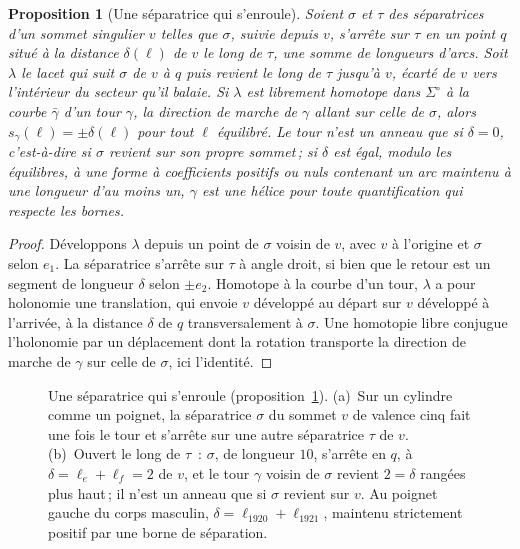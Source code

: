 \documentclass[11pt,a4paper]{article}
\newtheorem{proposition}{Proposition}
\newcommand{\shift}{s}
\begin{document}
\begin{proposition}[Une séparatrice qui s'enroule]\label{prop:winding}
Soient $\sigma$ et $\tau$ des séparatrices d'un sommet singulier $v$ telles
que $\sigma$, suivie depuis $v$, s'arrête sur $\tau$ en un point $q$ situé à
la distance $\delta(\ell)$ de $v$ le long de $\tau$, une somme de longueurs
d'arcs. Soit $\lambda$ le lacet qui suit $\sigma$ de $v$ à $q$ puis revient le
long de $\tau$ jusqu'à $v$, écarté de $v$ vers l'intérieur du secteur qu'il
balaie. Si $\lambda$ est librement homotope dans $\Sigma^\circ$ à la courbe
$\bar\gamma$ d'un tour $\gamma$, la direction de marche de $\gamma$ allant sur
celle de $\sigma$, alors $\shift_\gamma(\ell) = \pm\delta(\ell)$ pour tout
$\ell$ équilibré. Le tour n'est un anneau que si $\delta = 0$, c'est-à-dire si
$\sigma$ revient sur son propre sommet\,; si $\delta$ est égal, modulo les
équilibres, à une forme à coefficients positifs ou nuls contenant un arc
maintenu à une longueur d'au moins un, $\gamma$ est une hélice pour toute
quantification qui respecte les bornes.
\end{proposition}

\begin{proof}
Développons $\lambda$ depuis un point de $\sigma$ voisin de $v$, avec $v$ à
l'origine et $\sigma$ selon $e_1$. La séparatrice s'arrête sur $\tau$ à angle
droit, si bien que le retour est un segment de longueur $\delta$ selon $\pm
e_2$. Homotope à la courbe d'un tour, $\lambda$ a pour holonomie une
translation, qui envoie $v$ développé au départ sur $v$ développé à
l'arrivée, à la distance $\delta$ de $q$ transversalement à $\sigma$. Une
homotopie libre conjugue l'holonomie par un déplacement dont la rotation
transporte la direction de marche de $\gamma$ sur celle de $\sigma$, ici
l'identité.
\end{proof}

\begin{figure}[t]
\centering

\caption{Une séparatrice qui s'enroule (proposition~\ref{prop:winding}).
(a)~Sur un cylindre comme un poignet, la séparatrice $\sigma$ du sommet $v$ de
valence cinq fait une fois le tour et s'arrête sur une autre séparatrice
$\tau$ de $v$. (b)~Ouvert le long de $\tau$~: $\sigma$, de longueur $10$,
s'arrête en $q$, à $\delta = \ell_e + \ell_f = 2$ de $v$, et le tour $\gamma$
voisin de $\sigma$ revient $2 = \delta$ rangées plus haut\,; il n'est un
anneau que si $\sigma$ revient sur $v$. Au poignet gauche du corps masculin,
$\delta = \ell_{1920} + \ell_{1921}$, maintenu strictement positif par une
borne de séparation.}
\label{fig:separatrix}
\end{figure}
\end{document}
